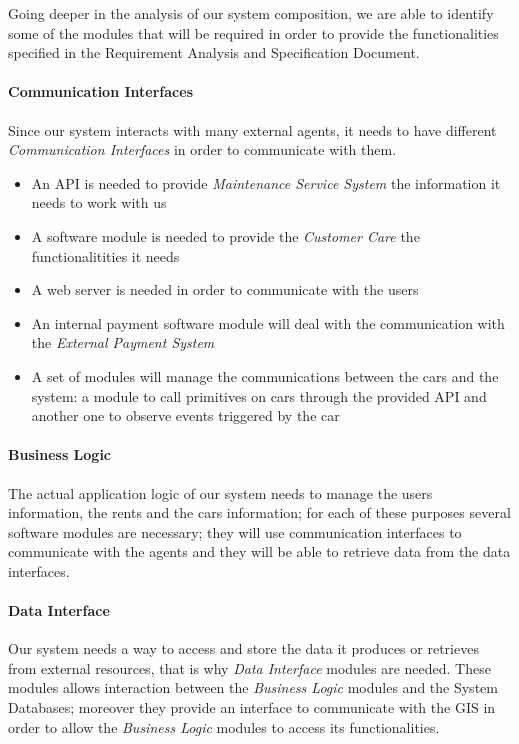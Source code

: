 		Going deeper in the analysis of our system composition, we are able to identify some of the modules that will be required in order to provide the functionalities specified in the Requirement Analysis and Specification Document. 
		\paragraph{Communication Interfaces}
			Since our system interacts with many external agents, it needs to have different \emph{Communication Interfaces} in order to communicate with them. 
		\begin{itemize}
			\item An API is needed to provide \emph{Maintenance Service System} the information it needs to work with us
			\item A software module is needed to provide the \emph{Customer Care} the functionalitities it needs
			\item A web server is needed in order to communicate with the users
			\item An internal payment software module will deal with the communication with the \emph{External Payment System} 
			\item A set of modules will manage the communications between the cars and the system: a module to call primitives on cars through the provided API and another one to observe events triggered by the car
		\end{itemize}
		\paragraph{Business Logic}
			The actual application logic of our system needs to manage the users information, the rents and the cars information; for each of these purposes several software modules are necessary; they will use communication interfaces to communicate with the agents and they will be able to retrieve data from the data interfaces.
		\paragraph{Data Interface}
			Our system needs a way to access and store the data it produces or retrieves from external resources, that is why \emph{Data Interface} modules are needed. These modules allows interaction between the \emph{Business Logic} modules and the System Databases; moreover they provide an interface to communicate with the GIS in order to allow the \emph{Business Logic} modules to access its functionalities.



